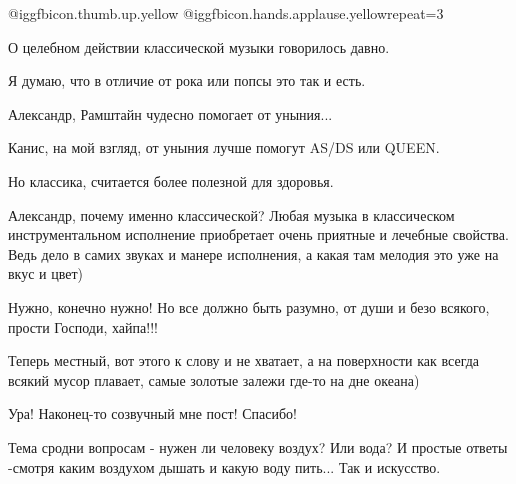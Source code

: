  
 
 
 
 
\zzSecCmt

\begin{itemize} %

 @igg{fbicon.thumb.up.yellow}  @igg{fbicon.hands.applause.yellow}{repeat=3} 

О целебном действии классической музыки говорилось давно.

Я думаю, что в отличие от рока или попсы это так и есть.

\begin{itemize} %

Александр, Рамштайн чудесно помогает от уныния...

Канис, на мой взгляд, от уныния лучше помогут AS/DS или QUEEN.

Но классика, считается более полезной для здоровья.

Александр, почему именно классической? Любая музыка в классическом
инструментальном исполнение приобретает очень приятные и лечебные свойства.
Ведь дело в самих звуках и манере исполнения, а какая там мелодия это уже на
вкус и цвет)
\end{itemize} %


Нужно, конечно нужно! Но все должно быть разумно, от души и безо всякого,
прости Господи, хайпа!!!

\begin{itemize} %

Теперь местный, вот этого к слову и не хватает, а на поверхности как всегда
всякий мусор плавает, самые золотые залежи где-то на дне океана)
\end{itemize} %


Ура! Наконец-то созвучный мне пост! Спасибо!


Тема сродни вопросам - нужен ли человеку воздух? Или вода? И простые ответы
-смотря каким воздухом дышать и какую воду пить... Так и искусство.


\end{itemize}
